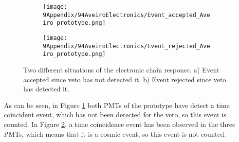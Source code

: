 \begin{enumerate}
\begin{figure}
\centering
    \begin{subfigure}[b]{0.42\textwidth}
    \centering
    \texttt{[image: 9Appendix/94AveiroElectronics/Event\_accepted\_Aveiro\_prototype.png]}  
    \caption{\label{subfig:TrueTritiumEvent}}
    \end{subfigure}
    \hfill
    \begin{subfigure}[b]{0.42\textwidth}
    \centering
    \texttt{[image: 9Appendix/94AveiroElectronics/Event\_rejected\_Aveiro\_prototype.png]}  
    \caption{\label{subfig:FalseTritiumEvent}}
    \end{subfigure}
 \caption{Two different situations of the electronic chain response. a) Event accepted since veto has not detected it. b) Event rejected since veto has detected it.}
 \label{fig:ScreenshotElectronic}
\end{figure}


As can be seen, in Figure \ref{subfig:TrueTritiumEvent} both PMTs of the prototype have detect a time coincident event, which has not been detected for the veto, so this event is counted. In Figure \ref{subfig:FalseTritiumEvent}, a time coincidence event has been observed in the three PMTs, which means that it is a cosmic event, so this event is not counted.
\end{enumerate}